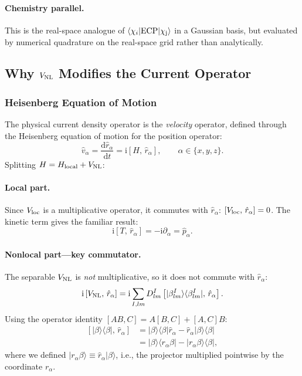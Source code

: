 \documentclass[12pt,letterpaper]{article}
\newcommand{\bra}[1]{\langle #1 \rvert}
\newcommand{\ket}[1]{\lvert #1 \rangle}
\newcommand{\mel}[3]{\langle #1 \vert #2 \vert #3 \rangle}
\newcommand{\comm}[2]{\left[ #1,\, #2 \right]}
\newcommand{\dd}{\mathrm{d}}
\newcommand{\ii}{\mathrm{i}}
\newcommand{\VNL}{V_{\rm NL}}
\newcommand{\Vloc}{V_{\rm loc}}
\begin{document}
\paragraph{Chemistry parallel.}
This is the real-space analogue of $\mel{\chi_i}{\rm ECP}{\chi_j}$ in a Gaussian
basis, but evaluated by numerical quadrature on the real-space grid rather than
analytically.

\subsection{Why \texorpdfstring{$\VNL$}{V\_NL} Modifies the Current Operator}
\label{sec:pp:current}

\subsubsection{Heisenberg Equation of Motion}

The physical current density operator is the \emph{velocity} operator, defined
through the Heisenberg equation of motion for the position operator:
\begin{equation}
  \hat{v}_\alpha = \frac{\dd \hat{r}_\alpha}{\dd t}
  = \ii\comm{H}{\hat{r}_\alpha}, \qquad \alpha \in \{x,y,z\}.
  \label{eq:heisenberg}
\end{equation}
Splitting $H = H_{\rm local} + \VNL$:

\paragraph{Local part.}
Since $\Vloc$ is a multiplicative operator, it commutes with $\hat{r}_\alpha$:
$\comm{\Vloc}{\hat{r}_\alpha} = 0$.
The kinetic term gives the familiar result:
\begin{equation}
  \ii\comm{T}{\hat{r}_\alpha} = -\ii\partial_\alpha = \hat{p}_\alpha.
  \label{eq:kin_vel}
\end{equation}

\paragraph{Nonlocal part---key commutator.}
The separable $\VNL$ is \emph{not} multiplicative, so it does not commute with
$\hat{r}_\alpha$:
\begin{equation}
  \ii\comm{\VNL}{\hat{r}_\alpha}
  = \ii\sum_{I,lm} D^I_{lm}\comm{\ket{\beta^I_{lm}}\bra{\beta^I_{lm}}}{\hat{r}_\alpha}.
  \label{eq:nlpp_comm}
\end{equation}
Using the operator identity $[AB, C] = A[B,C] + [A,C]B$:
\begin{align}
  \comm{\ket{\beta}\bra{\beta}}{\hat{r}_\alpha}
  &= \ket{\beta}\bra{\beta}\hat{r}_\alpha - \hat{r}_\alpha\ket{\beta}\bra{\beta} \nonumber \\
  &= \ket{\beta}\bra{r_\alpha\beta} - \ket{r_\alpha\beta}\bra{\beta},
  \label{eq:comm_expand}
\end{align}
where we defined $\ket{r_\alpha\beta} \equiv \hat{r}_\alpha\ket{\beta}$, i.e.,
the projector multiplied pointwise by the coordinate $r_\alpha$.
\end{document}
